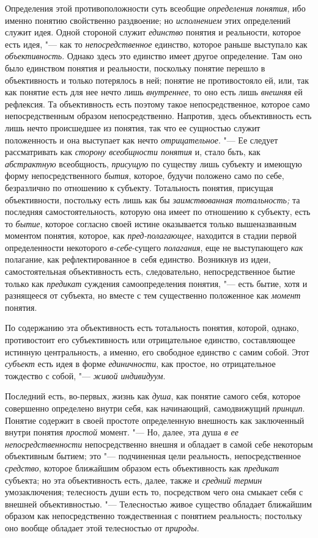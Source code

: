 Определения этой противоположности суть всеобщие {\em определения понятия},
ибо именно понятию свойственно раздвоение; но {\em исполнением} этих
определений служит идея. Одной стороной служит {\em единство} понятия и
реальности, которое есть идея, "--- как то {\em непосредственное}
единство, которое раньше выступало как {\em объективность}.
Однако здесь это единство имеет другое определение. Там оно
было единством понятия и реальности, поскольку понятие перешло в
объективность и только потерялось в ней; понятие не противостояло ей, или,
так как понятие есть для нее нечто лишь
{\em внутреннее}, то оно есть лишь {\em внешняя}
ей рефлексия. Та объективность есть поэтому такое
непосредственное, которое само непосредственным образом непосредственно.
Напротив, здесь объективность есть лишь нечто происшедшее из понятия, так
что ее сущностью служит положенность и она выступает как нечто
{\em отрицательное}. "--- Ее следует рассматривать как {\em сторону
всеобщности понятия} и, стало бьть, как {\em абстрактную}
всеобщность, {\em присущую} по
существу лишь субъекту и имеющую форму непосредственного {\em бытия}, которое,
будучи положено само по себе, безразлично по отношению к субъекту.
Тотальность понятия, присущая объективности, постольку есть лишь как бы
{\em заимствованная тотальность;}
та последняя самостоятельность, которую она
имеет по отношению к субъекту, есть то {\em бытие}, которое
согласно своей истине оказывается только вышеназванным моментом понятия,
которое, как {\em пред-полагающее},
находится в стадии первой определенности некоторого
{\em в-себе}-сущего {\em полагания}, еще не выступающего {\em как}
полагание, как рефлектированное в~себя единство. Возникнув
из идеи, самостоятельная объективность есть, следовательно,
непосредственное бытие только как {\em предикат} суждения
самоопределения понятия, "--- есть бытие, хотя и разнящееся от
субъекта, но вместе с тем существенно положенное как {\em момент} понятия.

По содержанию эта объективность есть тотальность понятия,
которой, однако, противостоит его субъективность или отрицательное
единство, составляющее истинную центральность, а именно, его свободное
единство с самим собой. Этот {\em субъект} есть идея в
форме {\em единичности}, как простое, но отрицательное тождество
с собой, "--- {\em живой индивидуум}.

Последний есть, во-первых, жизнь как {\em душа}, как понятие
самого себя, которое совершенно определено внутри себя, как начинающий,
самодвижущий {\em принцип}.
Понятие содержит в своей простоте определенную внешность как
заключенный внутри понятия
{\em простой} момент. "---
Но, далее, эта душа {\em в
ее непосредственности} непосредственно внешня и обладает в
самой себе некоторым объективным бытием; это "--- подчиненная
цели реальность, непосредственное
{\em средство}, которое
ближайшим образом есть объективность как
{\em предикат} субъекта;
но эта объективность есть, далее, также и
{\em средний термин}
умозаключения; телесность души есть то, посредством чего она
смыкает себя с внешней объективностью. "--- Телесностью живое
существо обладает ближайшим образом как непосредственно тождественная с
понятием реальность; постольку оно вообще обладает этой телесностью от
{\em природы}.


